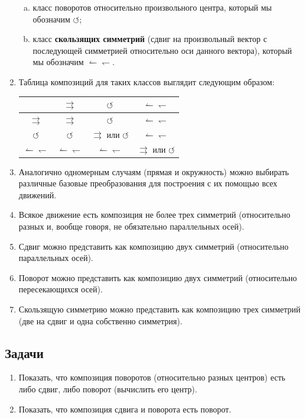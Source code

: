 \begin{enumerate}
\begin{enumerate}[a)]
\item класс поворотов относительно произвольного центра, который мы обозначим $\circlearrowleft$;
\item класс \textbf{скользящих симметрий} (сдвиг на произвольный вектор с последующей симметрией относительно оси данного вектора), который мы обозначим $\leftharpoonup\leftharpoondown$.
\end{enumerate}
\item Таблица композиций для таких классов выглядит следующим образом:
\begin{center}
\begin{tabular}{c|ccc}
 & $\rightrightarrows$ & $\circlearrowleft$ &  $\leftharpoonup\leftharpoondown$ \\ \hline
$\rightrightarrows$ & $\rightrightarrows$ &  $\circlearrowleft$ &  $\leftharpoonup\leftharpoondown$  \\ 
$\circlearrowleft$ & $\circlearrowleft$ & $\rightrightarrows$ или $\circlearrowleft$ & $\leftharpoonup\leftharpoondown$  \\ 
$\leftharpoonup\leftharpoondown$ & $\leftharpoonup\leftharpoondown$ & $\leftharpoonup\leftharpoondown$ & $\rightrightarrows$ или $\circlearrowleft$  \\ 
\end{tabular}
\end{center}
\item Аналогично одномерным случаям (прямая и окружность) можно выбирать различные базовые преобразования для построения с их помощью всех движений. 
\item Всякое движение есть композиция не более трех симметрий (относительно разных и, вообще говоря, не обязательно параллельных осей).
\item Сдвиг можно представить как композицию двух симметрий (относительно параллельных осей).
\item Поворот можно представить как композицию двух симметрий (относительно пересекающихся осей).
\item Скользящую симметрию можно представить как композицию трех симметрий (две на сдвиг и одна собственно симметрия).
\end{enumerate}


\subsection*{Задачи}
\begin{enumerate}
\item Показать, что композиция поворотов (относительно разных центров) есть либо сдвиг, либо поворот (вычислить его центр).
\item Показать, что композиция сдвига и поворота есть поворот.
\end{enumerate}



